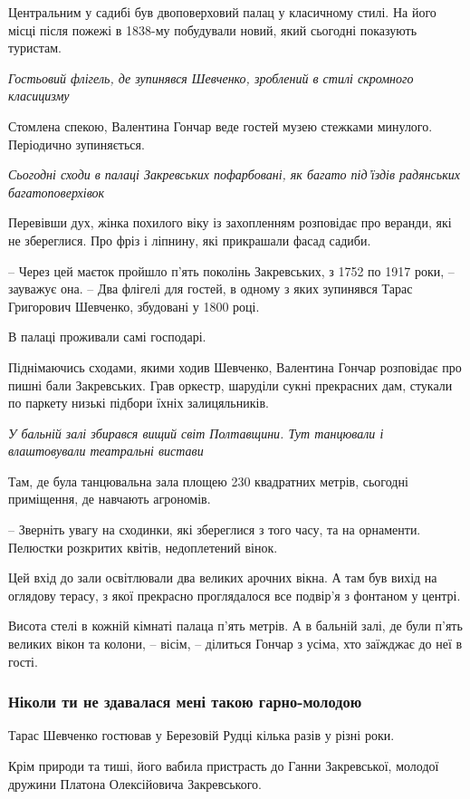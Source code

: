 Центральним у садибі був двоповерховий палац у класичному стилі. На його місці після пожежі в 1838-му побудували новий, який сьогодні показують туристам.

\emph{Гостьовий флігель, де зупинявся Шевченко, зроблений в стилі скромного класицизму}

Стомлена спекою, Валентина Гончар веде гостей музею стежками минулого. Періодично зупиняється.

\emph{Сьогодні сходи в палаці Закревських пофарбовані, як багато під'їздів радянських багатоповерхівок}

Перевівши дух, жінка похилого віку із захопленням розповідає про веранди, які
не збереглися. Про фріз і ліпнину, які прикрашали фасад садиби.

– Через цей маєток пройшло п’ять поколінь Закревських, з 1752 по 1917 роки, –
зауважує она. – Два флігелі для гостей, в одному з яких зупинявся Тарас
Григорович Шевченко, збудовані у 1800 році.

В палаці проживали самі господарі.

Піднімаючись сходами, якими ходив Шевченко, Валентина Гончар розповідає про
пишні бали Закревських. Грав оркестр, шаруділи сукні прекрасних дам, стукали по
паркету низькі підбори їхніх залицяльників.

\emph{У бальній залі збирався вищий світ Полтавщини. Тут танцювали і влаштовували театральні вистави}

Там, де була танцювальна зала площею 230 квадратних метрів, сьогодні приміщення, де навчають агрономів.

– Зверніть увагу на сходинки, які збереглися з того часу, та на орнаменти.
Пелюстки розкритих квітів, недоплетений вінок. 

Цей вхід до зали освітлювали два великих арочних вікна. А там був вихід на
оглядову терасу, з якої прекрасно проглядалося все подвір’я з фонтаном у
центрі.

Висота стелі в кожній кімнаті палаца п’ять метрів. А в бальній залі, де були
п’ять великих вікон та колони, – вісім, – ділиться Гончар з усіма, хто заїжджає
до неї в гості.

\subsubsection{Ніколи ти не здавалася мені такою гарно-молодою}

Тарас Шевченко гостював у Березовій Рудці кілька разів у різні роки.

Крім природи та тиші, його вабила пристрасть до Ганни Закревської, молодої
дружини Платона Олексійовича Закревського.

